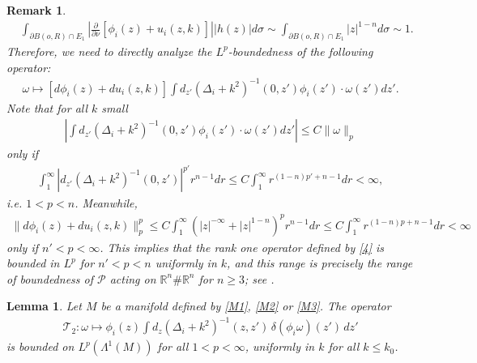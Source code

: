 \documentclass[12pt]{amsart}
\newtheorem{lemma}[theorem]{Lemma}
\newtheorem{remark}[theorem]{Remark}
\begin{document}
\begin{remark}
\begin{align*}
    &\int_{\partial B(o,R)\cap E_1} \left|\frac{\partial}{\partial \nu}[\phi_i(z) + u_i(z,k)]\right| |h(z)| d\sigma \sim  \int_{\partial B(o,R) \cap E_1} |z|^{1-n} d\sigma \sim 1.
\end{align*}
Therefore, we need to directly analyze the $L^p$-boundedness of the following operator:
\begin{align}\label{4}
    \omega \mapsto \left[ d\phi_i(z) + du_i(z,k) \right] \int d_{z'}(\Delta_i + k^2)^{-1}(0,z') \phi_i(z') \cdot \omega(z') dz'.
\end{align}
Note that for all $k$ small
\begin{align*}
    \left|\int d_{z'}(\Delta_i + k^2)^{-1}(0,z') \phi_i(z') \cdot \omega(z') dz'\right| \le C \|\omega\|_p
\end{align*}
only if 
\begin{align*}
    \int_1^\infty \left|d_{z'}(\Delta_i + k^2)^{-1}(0,z') \right|^{p'} r^{n-1} dr \le C \int_1^\infty r^{(1-n)p'+n-1} dr < \infty,
\end{align*}
i.e. $1<p<n$. Meanwhile,
\begin{align*}
    \|d\phi_i(z) + du_i(z,k)\|_p^p \le C \int_1^\infty \left(|z|^{-\infty} + |z|^{1-n} \right)^p r^{n-1} dr \le C \int_1^\infty r^{(1-n)p+n-1} dr <\infty
\end{align*}
only if $n'<p<\infty$. This implies that the rank one operator defined by \eqref{4} is bounded in $L^p$ for $n'<p<n$ uniformly in $k$, and this range is precisely the range of boundedness of $\mathcal{P}$ acting on $\mathbb{R}^n \# \mathbb{R}^n$ for $n\ge 3$; see \cite[Corollary~3.6]{He2}.

\end{remark}




\begin{lemma}\label{lem3.4}
Let $M$ be a manifold defined by \eqref{M1}, \eqref{M2} or \eqref{M3}. The operator
\begin{align*}
    \mathcal{T}_2: \omega \mapsto \phi_i(z) \int d_{z}(\Delta_i + k^2)^{-1}(z, z')\, \delta(\phi_i \omega)(z')\, dz'
\end{align*}
is bounded on $L^p(\Lambda^1(M))$ for all $1 < p < \infty$, uniformly in $k$ for all $k \le k_0$.
\end{lemma}
\end{document}
